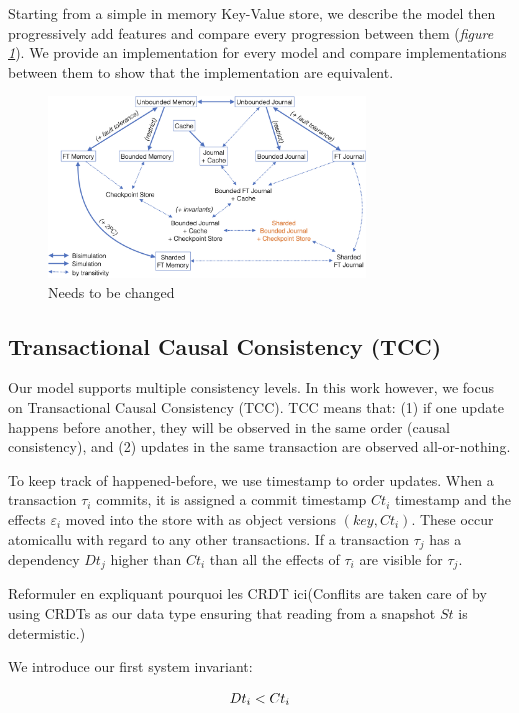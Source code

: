 \documentclass[systeme]{compas2022}
\begin{document}
Starting from a simple in memory Key-Value store, we describe the model then progressively add features and compare every progression between them (\emph{figure \ref{fig:transitions}}).
We provide an implementation for every model and compare implementations between them to show that the implementation are equivalent.

\begin{figure}[tp]
  \centering
  \includegraphics[width=0.75\textwidth]{figures/transitions.png}
  \caption{Needs to be changed}
  \label{fig:transitions}
\end{figure}

\subsection{Transactional Causal Consistency (TCC)}

Our model supports multiple consistency levels. In this work however, we focus on Transactional Causal Consistency (TCC).
TCC means that: (1) if one update happens before another, they will be observed in the same order (causal consistency), and (2) updates in the same transaction are observed all-or-nothing.

To keep track of happened-before, we use timestamp to order updates.
When a transaction $\tau_i$ commits, it is assigned a commit timestamp $Ct_i$ timestamp and the effects $\varepsilon_i$ moved into the store with as object versions $(key,Ct_i)$.
These occur atomicallu with regard to any other transactions.
If a transaction $\tau_j$ has a dependency $Dt_j$ higher than $Ct_i$ than all the effects of $\tau_i$ are visible for $\tau_j$.

Reformuler en expliquant pourquoi les CRDT ici(Conflits are taken care of by using CRDTs as our data type ensuring that reading from a snapshot $St$ is determistic.)

We introduce our first system invariant:

\[
  \begin{array}{lcl}
    \emph{$Dt_i < Ct_i$}
  \end{array} 
\]
\end{document}

